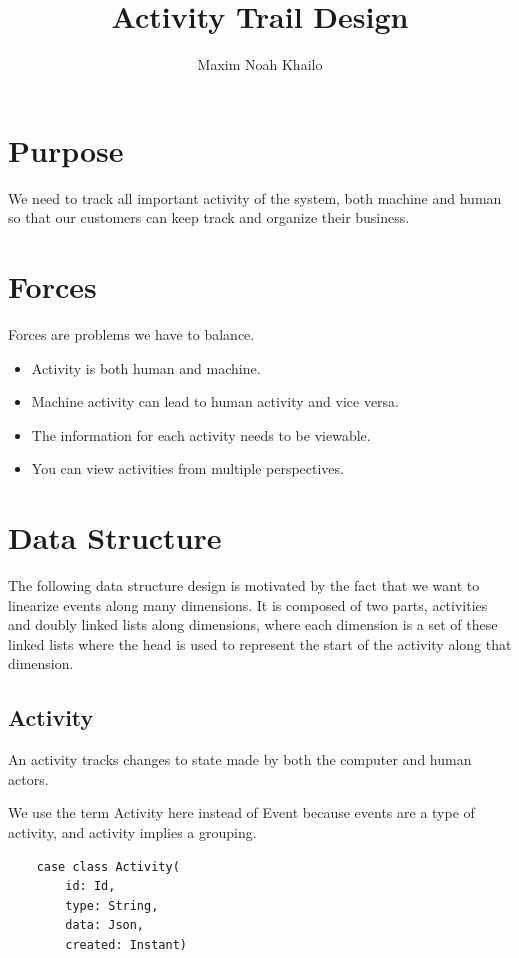 \documentclass[11pt]{article}
\title{Activity Trail Design}
\author{Maxim Noah Khailo}
\begin{document}
\maketitle
\section{Purpose}

We need to track all important activity of the system, both machine and human so that
our customers can keep track and organize their business.

\section{Forces}

Forces are problems we have to balance.

\begin{itemize}
    \item Activity is both human and machine.
    \item Machine activity can lead to human activity and vice versa.
    \item The information for each activity needs to be viewable. 
    \item You can view activities from multiple perspectives.
\end{itemize}


\section{Data Structure}

The following data structure design is motivated by the fact that we want to linearize 
events along many dimensions. It is composed of two parts, activities and doubly linked
lists along dimensions, where each dimension is a set of these linked lists where the head
is used to represent the start of the activity along that dimension. 


\newpage
\subsection{Activity}

An activity tracks changes to state made by both the computer and human actors.

We use the term Activity here instead of Event because events are a type of activity, and
activity implies a grouping.

\begin{lstlisting}
    case class Activity(
        id: Id, 
        type: String, 
        data: Json, 
        created: Instant)
\end{lstlisting}
\end{document}

